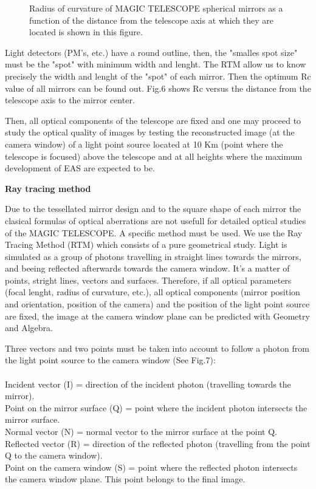 \begin{figure}[h]\centering
  \leavevmode \epsfxsize=6cm
  \caption{\tiny{Radius of curvature of MAGIC TELESCOPE spherical 
      mirrors as a function of the distance from the telescope axis at
      which they are located is shown in this figure.}}
\end{figure}
\vspace{0.2cm}


Light detectors (PM's, etc.) have a round outline, then, the "smalles
spot size" must be the "spot" with minimum width and lenght. The RTM
allow us to know precisely the width and lenght of the "spot" of each
mirror. Then the optimum Rc value of all mirrors can be found out.
Fig.6 shows Rc versus the distance from the telescope axis to the
mirror center.


Then, all optical components of the telescope are fixed and one may
proceed to study the optical quality of images by testing the
reconstructed image (at the camera window) of a light point source
located at 10 Km (point where the telescope is focused) above the
telescope and at all heights where the maximum development of EAS are
expected to be.

\vspace{0.5cm}

{\bf Ray tracing method}

Due to the tessellated mirror design and to the square shape of each
mirror the clasical formulas of optical aberrations are not usefull
for detailed optical studies of the MAGIC TELESCOPE.  A specific
method must be used. We use the Ray Tracing Method (RTM) which
consists of a pure geometrical study. Light is simulated as a group of
photons travelling in straight lines towards the mirrors, and beeing
reflected afterwards towards the camera window. It's a matter of
points, stright lines, vectors and surfaces. Therefore, if all optical
parameters (focal lenght, radius of curvature, etc.), all optical
components (mirror position and orientation, position of the camera)
and the position of the light point source are fixed, the image at the
camera window plane can be predicted with Geometry and Algebra.

\vspace{0.2cm}

Three vectors and two points must be taken into account to follow a
photon from the light point source to the camera window (See Fig.7):\\
\\ Incident vector (I) = direction of the incident photon (travelling
towards the mirror).\\ Point on the mirror surface (Q) = point where
the incident photon intersects the mirror surface. \\ Normal vector
(N) = normal vector to the mirror surface at the point Q.\\ Reflected
vector (R) = direction of the reflected photon (travelling from the
point Q to the camera window).\\ Point on the camera window (S) =
point where the reflected photon intersects the camera window
plane. This point belongs to the final image.\\

